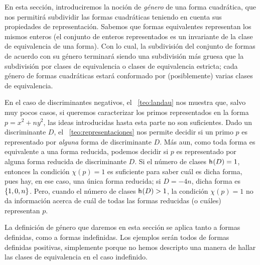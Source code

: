 \theoremstyle{plain}
\newtheorem{teoGeneros}{\teoname}[section]
\newtheorem{coroGeneros}[teoGeneros]{\coroname}
\newtheorem{lemaGeneros}[teoGeneros]{\lemaname}

\theoremstyle{definition}
\newtheorem{defGeneros}[teoGeneros]{}
\newtheorem{ejemGeneros}[teoGeneros]{\ejemname}
\newtheorem{obsGeneros}[teoGeneros]{\obsname}


En esta secci\'on, introduciremos la noci\'on de \emph{g\'enero}
de una forma cuadr\'atica, %
que nos permitir\'a subdividir las formas cuadr\'aticas
teniendo en cuenta sus propiedades de representaci\'on.
Sabemos que formas equivalentes representan los mismos enteros
(el conjunto de enteros representados es un invariante de la
clase de equivalencia de una forma).
Con lo cual, la subdivisi\'on del conjunto de formas de acuerdo con su
g\'enero terminar\'a siendo una subdivisi\'on m\'as gruesa que la
subdivisi\'on por clases de equivalencia o clases de equivalencia
estricta; cada g\'enero de formas cuadr\'aticas estar\'a conformado por
(posiblemente) varias clases de equivalencia.

En el caso de discriminantes negativos,
el \teoname~\ref{teo:landau} nos muestra que, salvo muy pocos casos,
si queremos caracterizar los primos representados en la forma
$p=x^2+ny^2$, las ideas introducidas hasta esta parte no son suficientes.
Dado un discriminante $D$, el \teoname~\ref{teo:representaciones} nos
permite decidir si un primo $p$ es representado por \emph{alguna} forma de
discriminante $D$.
M\'as aun, como toda forma es equivalente a una forma reducida,
podemos decidir si $p$ es representado por alguna forma reducida
de discriminante $D$.
Si el n\'umero de clases $\mathsf{h}_{}(D)=1$, entonces la condici\'on
$\chi(p)=1$ es suficiente para saber cu\'al es dicha forma, pues hay,
en ese caso, una \'unica forma reducida; si $D=-4n$, dicha forma es
$\left\{1,0,n\right\}$.
Pero, cuando el n\'umero de clases $\mathsf{h}_{}(D)>1$,
la condici\'on $\chi(p)=1$ no da informaci\'on acerca de cu\'al de todas
las formas reducidas (o cu\'ales) representan $p$.

La definici\'on de g\'enero que daremos en esta secci\'on
se aplica tanto a formas definidas, como a formas indefinidas.
Los ejemplos ser\'an todos de formas definidas positivas,
simplemente porque no hemos descripto una manera de hallar
las clases de equivalencia en el caso indefinido.

